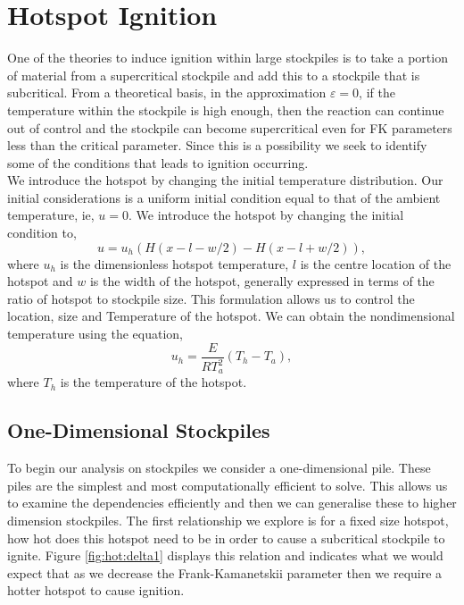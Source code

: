 \section{Hotspot Ignition}
One of the theories to induce ignition within large stockpiles is to take a portion of material from a supercritical stockpile and add this to a stockpile that is subcritical. From a theoretical basis, in the approximation $\varepsilon=0$, if the temperature within the stockpile is high enough, then the reaction can continue out of control and the stockpile can become supercritical even for FK parameters less than the critical parameter. Since this is a possibility we seek to identify some of the conditions that leads to ignition occurring.\\
We introduce the hotspot by changing the initial temperature distribution. Our initial considerations is a uniform initial condition equal to that of the ambient temperature, ie, $u=0$. We introduce the hotspot by changing the initial condition to,
\begin{equation}
u=u_h\left(H(x-l-w/2)-H(x-l+w/2)\right),
\end{equation} 
where $u_h$ is the dimensionless hotspot temperature, $l$ is the centre location of the hotspot and $w$ is the width of the hotspot, generally expressed in terms of the ratio of hotspot to stockpile size. This formulation allows us to control the location, size and Temperature of the hotspot. We can obtain the nondimensional temperature using the equation,
\begin{equation}
u_h=\frac{E}{RT_a^2}\left(T_h-T_a\right),
\end{equation} 
where $T_h$ is the temperature of the hotspot.

\subsection{One-Dimensional Stockpiles}
To begin our analysis on stockpiles we consider a one-dimensional pile. These piles are the simplest and most computationally efficient to solve. This allows us to examine the dependencies efficiently and then we can generalise these to higher dimension stockpiles. The first relationship we explore is for a fixed size hotspot, how hot does this hotspot need to be in order to cause a subcritical stockpile to ignite. Figure \ref{fig:hot:delta1} displays this relation and indicates what we would expect that as we decrease the Frank-Kamanetskii parameter then we require a hotter hotspot to cause ignition.\\

